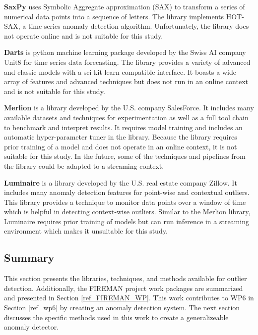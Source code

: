 \textbf{SaxPy} \parencite{senin2018grammarviz-saxpy} uses Symbolic Aggregate approximation (SAX) to transform a series of numerical data points into a sequence of letters.
The library implements HOT-SAX, a time series anomaly detection algorithm.
Unfortunately, the library does not operate online and is not suitable for this study.

\textbf{Darts} \parencite{herzen2021darts} is python machine learning package developed by the Swiss AI company Unit8 for time series data forecasting.
The library provides a variety of advanced and classic models with a sci-kit learn compatible interface.
It boasts a wide array of features and advanced techniques but does not run in an online context and is not suitable for this study.

\textbf{Merlion} \parencite{bhatnagar2021merlion} is a library developed by the U.S. company SalesForce.
It includes many available datasets and techniques for experimentation as well as a full tool chain to benchmark and interpret results.
It requires model training and includes an automatic hyper-parameter tuner in the library.
Because the library requires prior training of a model and does not operate in an online context, it is not suitable for this study. In the future, some of the techniques and pipelines from the library could be adapted to a streaming context.

\textbf{Luminaire} \parencite{chakraborty2020building-luminaire} is a library developed by the U.S. real estate company Zillow.
It includes many anomaly detection features for point-wise and contextual outliers.
This library provides a technique to monitor data points over a window of time which is helpful in detecting context-wise outliers. Similar to the Merlion library, Luminaire requires prior training of models but can run inference in a streaming environment which makes it unsuitable for this study.

\subsection{Summary}
This section presents the libraries, techniques, and methods available for outlier detection.
Additionally, the FIREMAN project work packages are summarized and presented in Section \ref{ref_FIREMAN_WP}.
This work contributes to WP6 in Section \ref{ref_wp6} by creating an anomaly detection system.
The next section discusses the specific methods used in this work to create a generalizeable anomaly detector.


